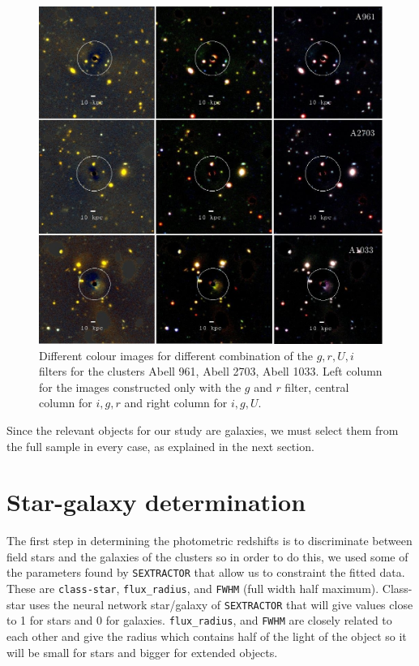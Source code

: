 \begin{figure}[H]
\centering
\includegraphics[width=14cm]{images/full_small.jpg}
\caption[Colour images for various clusters]{Different colour images for different combination of the $g,r,U,i$ filters for the clusters Abell 961, Abell 2703, Abell 1033. Left column for the images constructed only with the $g$ and $r$ filter, central column for $i,g,r$ and right column for $i,g,U$.}
\end{figure}

Since the relevant objects for our study are galaxies, we must select them from the full sample in every case, as explained in the next section.

\section{Star-galaxy determination}

The first step in determining the photometric redshifts is to discriminate between field stars and the galaxies of the clusters so in order to do this, we used some of the parameters found by \texttt{SEXTRACTOR} that allow us to constraint the fitted data. These are \texttt{class-star}, \texttt{flux\_radius}, and \texttt{FWHM} (full width half maximum). Class-star uses the neural network star/galaxy of \texttt{SEXTRACTOR} that will give values close to 1 for stars and 0 for galaxies. \texttt{flux\_radius}, and \texttt{FWHM} are closely related to each other and give the radius which contains half of the light of the object so it will be small for stars and bigger for extended objects.

